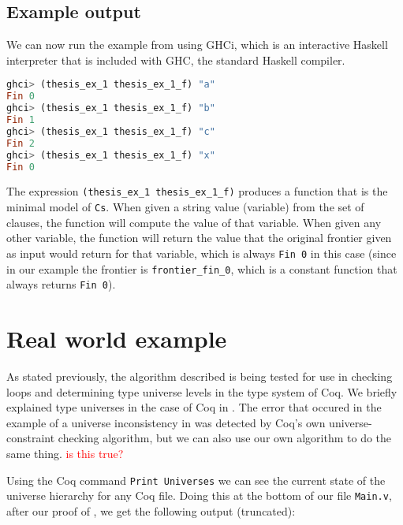 \subsection{Example output}
\label{sssec:example_output}

We can now run the example from  using GHCi,
which is an interactive Haskell interpreter that is included with GHC, the standard Haskell compiler.

\begin{minipage}{\linewidth}
\begin{lstlisting}[language=Haskell, label={lst:thm_32_haskell_output}, caption={\lstinline{thm_32} example output}]
ghci> (thesis_ex_1 thesis_ex_1_f) "a"
Fin 0
ghci> (thesis_ex_1 thesis_ex_1_f) "b"
Fin 1
ghci> (thesis_ex_1 thesis_ex_1_f) "c"
Fin 2
ghci> (thesis_ex_1 thesis_ex_1_f) "x"
Fin 0
\end{lstlisting}
\end{minipage}

The expression \lstinline[language=Haskell]{(thesis_ex_1 thesis_ex_1_f)} produces a function that is the minimal model of \lstinline{Cs}.
When given a string value (variable) from the set of clauses, the function will compute the value of that variable.
When given any other variable, the function will return the value that the original frontier given as input
would return for that variable, which is always \lstinline{Fin 0} in this case
(since in our example the frontier is \lstinline{frontier_fin_0},
which is a constant function that always returns \lstinline{Fin 0}).

\section{Real world example}
\label{sec:real_world_example}

As stated previously, the algorithm described  is being
tested for use in checking loops and determining type universe levels in the
type system of Coq.
We briefly explained type universes in the case of Coq in .
The error that occured in the example of a universe inconsistency in 
was detected by Coq's own universe-constraint checking algorithm, but we can also use our own algorithm to do the same thing.
\textcolor{red}{is this true?}

Using the Coq command \lstinline{Print Universes} we can see the current state of the universe hierarchy for any Coq file.
Doing this at the bottom of our file \lstinline{Main.v}, after our proof of ,
we get the following output (truncated):

